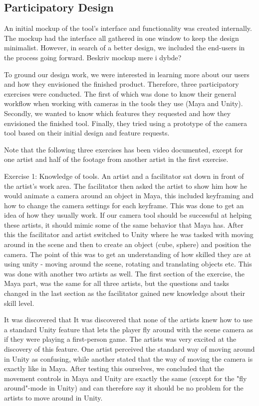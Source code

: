 \subsection{Participatory Design}
An initial mockup of the tool's interface and functionality was created internally. The mockup had the interface all gathered in one window to keep the design minimalist. However, in search of a better design, we included the end-users in the process going forward. Beskriv mockup mere i dybde?

To ground our design work, we were interested in learning more about our users and how they envisioned the finished product. Therefore, three participatory exercises were conducted. The first of which was done to know their general workflow when working with cameras in the tools they use (Maya and Unity). Secondly, we wanted to know which features they requested and how they envisioned the finished tool. Finally, they tried using a prototype of the camera tool based on their initial design and feature requests.

Note that the following three exercises has been video documented, except for one artist and half of the footage from another artist in the first exercise.

Exercise 1: Knowledge of tools. 
An artist and a facilitator sat down in front of the artist's work area. The facilitator then asked the artist to show him how he would animate a camera around an object in Maya, this included keyframing and how to change the camera settings for each keyframe. This was done to get an idea of how they usually work. If our camera tool should be successful at helping these artists, it should mimic some of the same behavior that Maya has. After this the facilitator and artist switched to Unity where he was tasked with moving around in the scene and then to create an object (cube, sphere) and position the camera. The point of this was to get an understanding of how skilled they are at using unity - moving around the scene, rotating and translating objects etc. This was done with another two artists as well. The first section of the exercise, the Maya part, was the same for all three artists, but the questions and tasks changed in the last section as the facilitator gained new knowledge about their skill level.

It was discovered that 
It was discovered that none of the artists knew how to use a standard Unity feature that lets the player fly around with the scene camera as if they were playing a first-person game. The artists was very excited at the discovery of this feature. One artist perceived the standard way of moving around in Unity as confusing, while another stated that the way of moving the camera is exactly like in Maya. After testing this ourselves, we concluded that the movement controls in Maya and Unity are exactly the same (except for the "fly around"-mode in Unity) and can therefore say it should be no problem for the artists to move around in Unity. 

